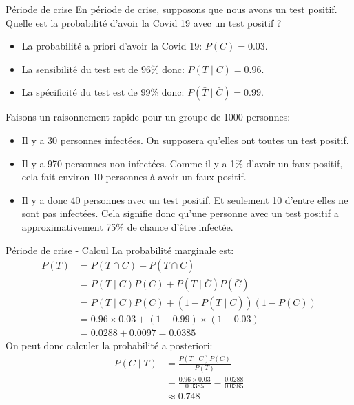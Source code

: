 \begin{frame}{Période de crise}
	En période de crise, supposons que nous avons un test positif. Quelle est la probabilité d'avoir la Covid 19 avec un test positif ?
	\begin{itemize}
		\item La probabilité a priori d'avoir la Covid 19: $P(C) = 0.03$. 
		\item La sensibilité du test est de 96\% donc: $P(T \mid C) = 0.96$.
		\item La spécificité du test est de 99\% donc: $P(\bar{T} \mid \bar{C}) = 0.99$.
	\end{itemize}
	\vspace{0.5cm}
	\pause
	Faisons un raisonnement rapide pour un groupe de 1000 personnes:
	\begin{itemize}
		\item Il y a 30 personnes infectées. On supposera qu'elles ont toutes un test positif.
		\pause
		\item Il y a 970 personnes non-infectées. Comme il y a 1\% d'avoir un faux positif, cela fait environ 10 personnes à avoir un faux positif.
		\pause
		\item Il y a donc 40 personnes avec un test positif. Et seulement 10 d'entre elles ne sont pas infectées. Cela signifie donc qu'une personne avec un test positif a approximativement 75\% de chance d'être infectée.
	\end{itemize}
\end{frame}

\begin{frame}{Période de crise - Calcul}
	La probabilité marginale est:
	\begin{equation}
		\begin{aligned}
			P(T) &= P(T \cap C) + P(T \cap \bar{C}) \\
			&= P(T \mid C) P(C) + P(T \mid \bar{C}) P(\bar{C}) \\
			&= P(T \mid C) P(C) + (1 - P(\bar{T} \mid \bar{C})) (1 - P(C)) \\
			&= 0.96 \times 0.03 + (1 - 0.99) \times (1 - 0.03) \\
			&= 0.0288 + 0.0097 = 0.0385
		\end{aligned}
		\nonumber
	\end{equation}
	\pause
	On peut donc calculer la probabilité a posteriori:
	\begin{equation}
		\begin{aligned}
			P(C \mid T) &= \frac{P(T \mid C) P(C)}{P(T)} \\
			&= \frac{0.96 \times 0.03}{0.0385} 
			= \frac{0.0288}{0.0385} \\
			&\approx 0.748
		\end{aligned}
		\nonumber
	\end{equation}
\end{frame}

